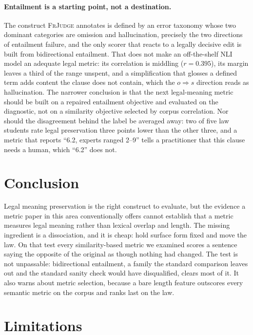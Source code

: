 \documentclass[11pt]{article}
\begin{document}
\paragraph{Entailment is a starting point, not a destination.}
The construct \textsc{FrJudge} annotates is defined by an error taxonomy whose
two dominant categories are omission and hallucination, precisely the two
directions of entailment failure, and the only scorer that reacts to a legally
decisive edit is built from bidirectional entailment. That does not make an off-the-shelf NLI model an
adequate legal metric: its correlation is middling ($r=0.395$), its margin
leaves a third of the range unspent, and a simplification that glosses a defined
term adds content the clause does not contain, which the $o \Rightarrow s$
direction reads as hallucination. The narrower conclusion is that the next
legal-meaning metric should be built on a repaired entailment objective and
evaluated on the diagnostic, not on a similarity objective selected by corpus
correlation. Nor should the disagreement behind the label be averaged away: two
of five law students rate legal preservation three points lower than the other
three, and a metric that reports ``6.2, experts ranged 2--9'' tells a
practitioner that this clause needs a human, which ``6.2'' does not.

\section{Conclusion}

Legal meaning preservation is the right construct to evaluate, but the evidence
a metric paper in this area conventionally offers cannot establish that a metric
measures legal meaning rather than lexical overlap and length. The missing
ingredient is a dissociation, and it is cheap: hold surface form fixed and move
the law. On that test every similarity-based metric we examined scores a
sentence saying the opposite of the original as though nothing had changed. The
test is not unpassable: bidirectional entailment, a family the standard
comparison leaves out and the standard sanity check would have disqualified,
clears most of it. It also warns about metric selection, because a bare length
feature outscores every semantic metric on the corpus and ranks last on the law.

\section*{Limitations}
\label{sec:limits}
\end{document}
